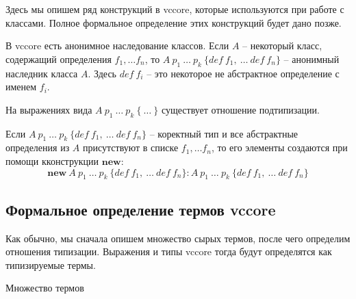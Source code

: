 \documentclass{amsart}
\theoremstyle{definition}
\theoremstyle{remark}
\numberwithin{figure}{section}
\begin{document}
Здесь мы опишем ряд конструкций в vccore, которые используются при работе с классами.
Полное формальное определение этих конструкций будет дано позже.

В vccore есть анонимное наследование классов.
Если $A$ -- некоторый класс, содержащий определения $f_1, \ldots f_n$, то $A\ p_1\ \ldots\ p_k\ \{ def\ f_1,\ \ldots\ def\ f_n \}$ -- анонимный наследник класса $A$.
Здесь $def\ f_i$ -- это некоторое не абстрактное определение с именем $f_i$.

На выражениях вида $A\ p_1\ \ldots\ p_k\ \{\ \ldots\ \}$ существует отношение подтипизации.

Если $A\ p_1\ \ldots\ p_k\ \{ def\ f_1,\ \ldots\ def\ f_n \}$ -- коректный тип и все абстрактные определения из $A$ присутствуют в списке $f_1, \ldots f_n$, то его элементы создаются при помощи кконструкции $\mathbf{new}$:
\[ \mathbf{new}\ A\ p_1\ \ldots\ p_k\ \{ def\ f_1,\ \ldots\ def\ f_n \} : A\ p_1\ \ldots\ p_k\ \{ def\ f_1,\ \ldots\ def\ f_n \} \]

\subsection{Формальное определение термов vccore}

Как обычно, мы сначала опишем множество сырых термов, после чего определим отношения типизации.
Выражения и типы vccore тогда будут определятся как типизируемые термы.

Множество термов



\end{document}

